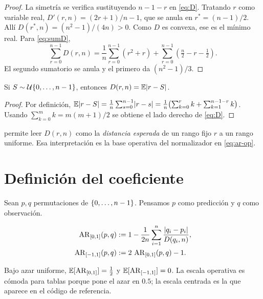 \documentclass{claudeeditorial}
\newcommand{\ARop}{\operatorname{AR}_{[0,1]}}
\newcommand{\ARc}{\operatorname{AR}_{[-1,1]}}
\begin{document}
\begin{proof}
La simetría se verifica sustituyendo $n-1-r$ en \cref{eq:D}. Tratando
$r$ como variable real, $D'(r,n)=(2r+1)/n-1$, que se anula en
$r^\ast=(n-1)/2$. Allí $D(r^\ast,n)=(n^2-1)/(4n)>0$. Como $D$ es
convexa, ese es el mínimo real. Para \cref{eq:sumD},
\[
  \sum_{r=0}^{n-1}D(r,n)
  =\frac{1}{n}\sum_{r=0}^{n-1}(r^2+r)
   +\sum_{r=0}^{n-1}\!\left(\tfrac{n}{2}-r-\tfrac{1}{2}\right).
\]
El segundo sumatorio se anula y el primero da $(n^2-1)/3$.
\end{proof}

\begin{proposition}\label{thm:D-prob}
Si $S\sim\mathcal{U}\{0,\ldots,n-1\}$, entonces
$D(r,n)=\mathbb{E}\lvert r-S\rvert$.
\end{proposition}

\begin{proof}
Por definición,
$\mathbb{E}\lvert r-S\rvert=\frac{1}{n}\sum_{s=0}^{n-1}\lvert r-s\rvert
=\frac{1}{n}\bigl(\sum_{k=0}^{r}k+\sum_{k=1}^{n-1-r}k\bigr)$.
Usando $\sum_{k=0}^{m}k=m(m+1)/2$ se obtiene el lado derecho de
\cref{eq:D}.
\end{proof}

\begin{observacion}
 permite leer $D(r,n)$ como la \emph{distancia
esperada} de un rango fijo $r$ a un rango uniforme. Esa interpretación
es la base operativa del normalizador en \cref{eq:ar-op}.
\end{observacion}

\section{Definición del coeficiente}

Sean $p,q$ permutaciones de $\{0,\ldots,n-1\}$. Pensamos $p$ como
predicción y $q$ como observación.

\begin{definition}\label{def:dos-escalas}
\begin{align}
  \ARop(p,q) &:= 1-\frac{1}{2n}\sum_{i=1}^{n}\frac{\abs{q_i-p_i}}{D(q_i,n)}, \label{eq:ar-op}\\
  \ARc(p,q)  &:= 2\,\ARop(p,q)-1.\label{eq:ar-centered}
\end{align}
\end{definition}

\begin{remark}
Bajo azar uniforme, $\E[\ARop]=\tfrac{1}{2}$ y $\E[\ARc]=0$. La escala
operativa es cómoda para tablas porque pone el azar en $0.5$; la
escala centrada es la que aparece en el código de referencia.
\end{remark}
\end{document}
